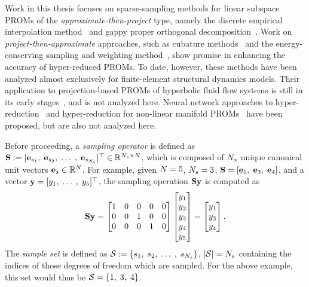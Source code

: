 Work in this thesis focuses on sparse-sampling methods for linear subspace PROMs of the \textit{approximate-then-project} type, namely the discrete empirical interpolation method~\cite{Chaturantabut2010} and gappy proper orthogonal decomposition~\cite{Everson1995}. Work on \textit{project-then-approximate} approaches, such as cubature methods~\cite{An2008,Hernandez2017} and the energy-conserving sampling and weighting method~\cite{Farhat2014}, show promise in enhancing the accuracy of hyper-reduced PROMs. To date, however, these methods have been analyzed almost exclusively for finite-element structural dynamics models. Their application to projection-based PROMs of hyperbolic fluid flow systems is still in its early stages~\cite{Grimberg2020Hyper}, and is not analyzed here. Neural network approaches to hyper-reduction~\cite{nnHyperRed} and hyper-reduction for non-linear manifold PROMs~\cite{Kim2022} have been proposed, but are also not analyzed here.

Before proceeding, a \textit{sampling operator} is defined as $\mathbf{S} := [\mathbf{e}_{s_1}, \; \mathbf{e}_{s_2}, \; \hdots \;, \; \mathbf{e}_{s_{N_s}} ]^\top \in \mathbb{R}^{N_s \times N}$, which is composed of $N_s$ unique canonical unit vectors $\mathbf{e}_{s} \in \mathbb{R}^{N}$. For example, given $N = 5$, $N_s = 3$, $\mathbf{S} = [\mathbf{e}_1, \; \mathbf{e}_3, \; \mathbf{e}_4]$,
and a vector $\mathbf{y} = [y_1, \; \hdots \;, \; y_5]^\top$, the sampling operation $\mathbf{S} \mathbf{y}$ is computed as
%
\begin{equation}
	\mathbf{S} \mathbf{y} =
	\begin{bmatrix}
		1 & 0 & 0 & 0 & 0 \\
		0 & 0 & 1 & 0 & 0 \\
		0 & 0 & 0 & 1 & 0 \\
	\end{bmatrix}
	\begin{bmatrix}
		y_1 \\ y_2 \\ y_3 \\ y_4 \\ y_5
	\end{bmatrix} =
	\begin{bmatrix}
		y_1 \\ y_3 \\ y_4
	\end{bmatrix}.
\end{equation}
%
The \textit{sample set} is defined as $\mathcal{S} := \{s_1, \; s_2, \; \hdots \;, \; s_{N_s}\}$, $| \mathcal{S} | = N_s$ containing the indices of those degrees of freedom which are sampled. For the above example, this set would thus be $\mathcal{S} = \{1, \; 3, \; 4\}$.

